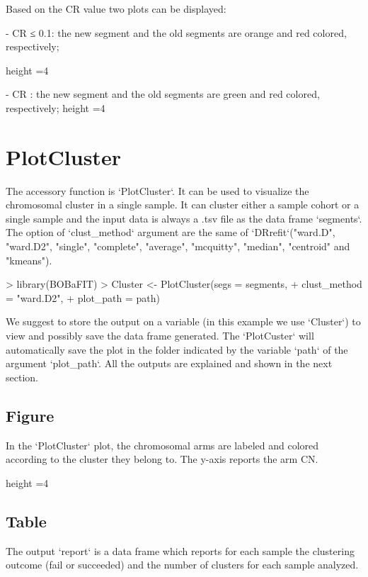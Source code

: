 \documentclass{article}
\begin{document}
Based on the CR value two plots can be displayed:

-   CR ≤ 0.1: the new segment and the old segments are orange and red colored, respectively;

 {height =4}

-   CR : the new segment and the old segments are green and red colored, respectively;
 {height =4}

\section*{PlotCluster}
The accessory function is `PlotCluster`. It can be used to visualize the chromosomal cluster in a single sample. It can cluster either a sample cohort or a single sample and the input data is always a .tsv file as the data frame `segments`. The option of `clust_method` argument are the same of `DRrefit`("ward.D", "ward.D2", "single", "complete", "average", "mcquitty", "median", "centroid" and "kmeans").

\begin{Schunk}
\begin{Sinput}
> library(BOBaFIT)
> Cluster <- PlotCluster(segs = segments,
+                        clust_method = "ward.D2",
+                        plot_path = path)
\end{Sinput}
\end{Schunk}

We suggest to store the output on a variable (in this example we use `Cluster`) to view and possibly save the data frame generated. The `PlotCuster` will automatically save the plot in the folder indicated by the variable `path` of the argument `plot_path`. All the outputs are explained and shown in the next section.

\subsection*{Figure}
In the `PlotCluster` plot, the chromosomal arms are labeled and colored according to the cluster they belong to. The y-axis reports the arm CN.

 {height =4}

\subsection*{Table}
The output `report` is a data frame which reports for each sample the clustering outcome (fail or succeeded) and the number of clusters for each sample analyzed.
\end{document}

